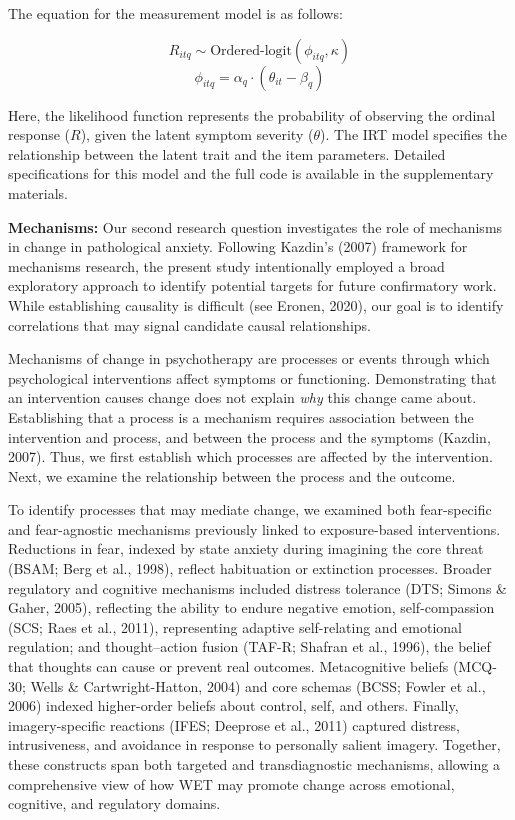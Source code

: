 \documentclass[
  man,floatsintext]{apa7}
\begin{document}
The equation for the measurement model is as follows:

\[R_{itq} \sim \text{Ordered-logit}(\phi_{itq}, \kappa)\]
\[\phi_{itq} = \alpha_q \cdot (\theta_{it} - \beta_q)\]

Here, the likelihood function represents the probability of observing the ordinal response (\(R\)), given the latent symptom severity (\(\theta\)).
The IRT model specifies the relationship between the latent trait and the item parameters.
Detailed specifications for this model and the full code is available in the supplementary materials.

\textbf{Mechanisms:} Our second research question investigates the role of mechanisms in change in pathological anxiety.
Following Kazdin's (2007) framework for mechanisms research, the present study intentionally employed a broad exploratory approach to identify potential targets for future confirmatory work.
While establishing causality is difficult (see Eronen, 2020), our goal is to identify correlations that may signal candidate causal relationships.

Mechanisms of change in psychotherapy are processes or events through which psychological interventions affect symptoms or functioning.
Demonstrating that an intervention causes change does not explain \emph{why} this change came about.
Establishing that a process is a mechanism requires association between the intervention and process, and between the process and the symptoms (Kazdin, 2007).
Thus, we first establish which processes are affected by the intervention.
Next, we examine the relationship between the process and the outcome.

To identify processes that may mediate change, we examined both fear-specific and fear-agnostic mechanisms previously linked to exposure-based interventions.
Reductions in fear, indexed by state anxiety during imagining the core threat (BSAM; Berg et al., 1998), reflect habituation or extinction processes.
Broader regulatory and cognitive mechanisms included distress tolerance (DTS; Simons \& Gaher, 2005), reflecting the ability to endure negative emotion, self-compassion (SCS; Raes et al., 2011), representing adaptive self-relating and emotional regulation; and thought--action fusion (TAF-R; Shafran et al., 1996), the belief that thoughts can cause or prevent real outcomes.
Metacognitive beliefs (MCQ-30; Wells \& Cartwright-Hatton, 2004) and core schemas (BCSS; Fowler et al., 2006) indexed higher-order beliefs about control, self, and others.
Finally, imagery-specific reactions (IFES; Deeprose et al., 2011) captured distress, intrusiveness, and avoidance in response to personally salient imagery.
Together, these constructs span both targeted and transdiagnostic mechanisms, allowing a comprehensive view of how WET may promote change across emotional, cognitive, and regulatory domains.
\end{document}
